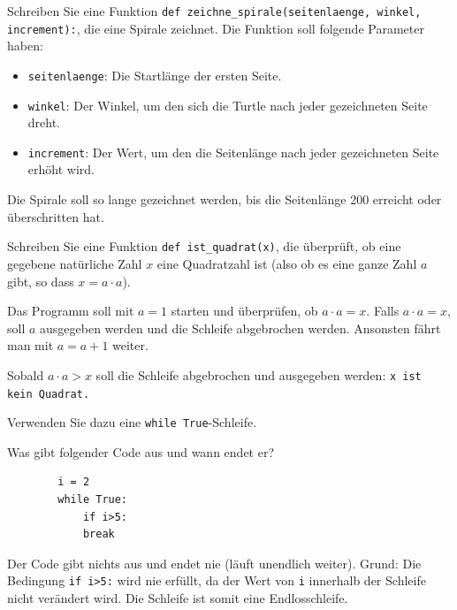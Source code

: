 \begin{myexercise}
	Schreiben Sie eine Funktion \lstinline|def zeichne_spirale(seitenlaenge, winkel, increment):|, die eine Spirale zeichnet. Die Funktion soll folgende Parameter haben:
	\begin{itemize}
		\item \lstinline|seitenlaenge|: Die Startlänge der ersten Seite.
		\item \lstinline|winkel|: Der Winkel, um den sich die Turtle nach jeder gezeichneten Seite dreht.
		\item \lstinline|increment|: Der Wert, um den die Seitenlänge nach jeder gezeichneten Seite erhöht wird.
	\end{itemize}
	Die Spirale soll so lange gezeichnet werden, bis die Seitenlänge 200 erreicht oder überschritten hat.

	\begin{myanswer}
		
	\end{myanswer}
\end{myexercise}

\begin{myexercise}
	Schreiben Sie eine Funktion \lstinline|def ist_quadrat(x)|, die überprüft, ob eine gegebene natürliche Zahl $x$ eine Quadratzahl ist (also ob es eine ganze Zahl $a$ gibt, so dass $x = a \cdot a$).

	Das Programm soll mit $a = 1$ starten und überprüfen, ob $a \cdot a = x$. Falls $a \cdot a = x$, soll $a$ ausgegeben werden und die Schleife abgebrochen werden. Ansonsten fährt man mit $a = a+1$ weiter.

	Sobald $a \cdot a > x$ soll die Schleife abgebrochen und ausgegeben werden: \texttt{x ist kein Quadrat.}

	Verwenden Sie dazu eine \lstinline|while True|-Schleife.

	\begin{myanswer}
		
	\end{myanswer}
\end{myexercise}

\begin{mychallenge}
	Was gibt folgender Code aus und wann endet er?
	\begin{lstlisting}
		i = 2
		while True:
			if i>5:
			break
	\end{lstlisting}

	\begin{myanswer}
		Der Code gibt nichts aus und endet nie (läuft unendlich weiter). Grund: Die Bedingung \lstinline|if i>5:| wird nie erfüllt, da der Wert von \lstinline|i| innerhalb der Schleife nicht verändert wird. Die Schleife ist somit eine Endlosschleife.
	\end{myanswer}
\end{mychallenge}

